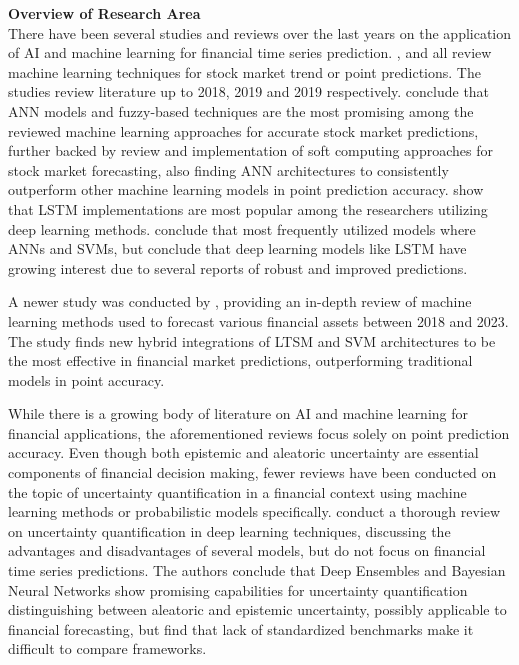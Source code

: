 \textbf{Overview of Research Area}\\
There have been several studies and reviews over the last years on the application of AI and machine learning for financial time series prediction. \textcite{gandhmalstockmarket2019}, \textcite{Li2020} and \textcite{Kumbure2022} all review machine learning techniques for stock market trend or point predictions. The studies review literature up to 2018, 2019 and 2019 respectively. \textcite{gandhmalstockmarket2019} conclude that ANN models and fuzzy-based techniques are the most promising among the reviewed machine learning approaches for accurate stock market predictions, further backed by \textcite{shi2019soft} review and implementation of soft computing approaches for stock market forecasting, also finding ANN architectures to consistently outperform other machine learning models in point prediction accuracy. \textcite{Li2020} show that LSTM implementations are most popular among the researchers utilizing deep learning methods. \textcite{Kumbure2022} conclude that most frequently utilized models where ANNs and SVMs, but conclude that deep learning models like LSTM have growing interest due to several reports of robust and improved predictions. 

A newer study was conducted by \textcite{Khattak2023SurveyAIModels}, providing an in-depth review of machine learning methods used to forecast various financial assets between 2018 and 2023. The study finds new hybrid integrations of LTSM and SVM architectures to be the most effective in financial market predictions, outperforming traditional models in point accuracy.

While there is a growing body of literature on AI and machine learning for financial applications, the aforementioned reviews focus solely on point prediction accuracy. Even though both epistemic and aleatoric uncertainty are essential components of financial decision making, fewer reviews have been conducted on the topic of uncertainty quantification in a financial context using machine learning methods or probabilistic models specifically. \textcite{abdar2021ReviewUQ} conduct a thorough review on uncertainty quantification in deep learning techniques, discussing the advantages and disadvantages of several models, but do not focus on financial time series predictions. The authors conclude that Deep Ensembles and Bayesian Neural Networks show promising capabilities for uncertainty quantification distinguishing between aleatoric and epistemic uncertainty, possibly applicable to financial forecasting, but find that lack of standardized benchmarks make it difficult to compare frameworks.

